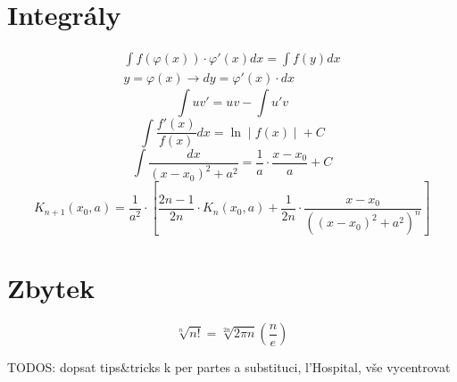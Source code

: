 \documentclass[a4paper]{article}
\begin{document}
\begin{multicols}{2}
    \section*{Integrály}
        \begin{align*}
            { \int f(\varphi(x)) \cdot \varphi'(x)dx = \int f(y)dx }\\
            { y = \varphi(x) \rightarrow dy = \varphi'(x) \cdot dx }
        \end{align*}
         \[ \int uv' = uv - \int u'v \]
        \[ \int \frac{f'(x)}{f(x)}dx = \ln\mid{f(x)\mid} + C \]
        \[ \int \frac{dx}{{(x-x_0)}^2 + a^2} = \frac{1}{a} \cdot \frac{x-x_0}{a} + C \]
        \[ K_{n+1}(x_0, a) = \frac{1}{a^2} \cdot \left[ \frac{2n-1}{2n} \cdot K_n(x_0, a) + \frac{1}{2n} \cdot \frac{x - x_0}{{({(x-x_0)}^2 + a^2)}^n} \right] \]
    \section*{Zbytek}
        \[ \sqrt[n]{n!} = \sqrt[2n]{2\pi n}\left(\frac{n}{e}\right) \]
\end{multicols}


TODOS\@: dopsat tips\&tricks k per partes a substituci, l'Hospital, vše vycentrovat
\end{document}
